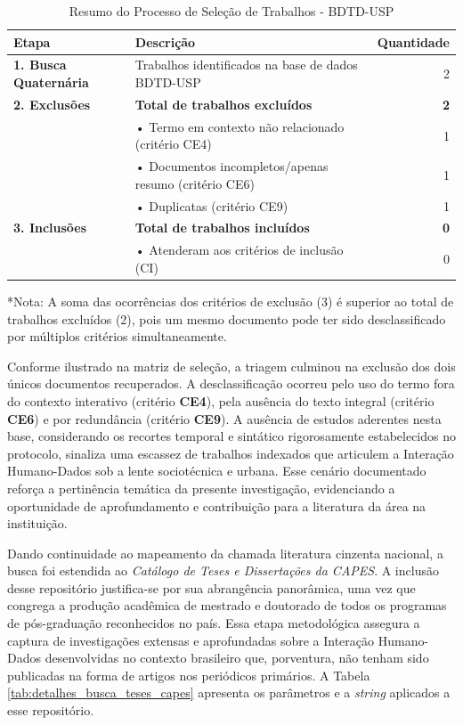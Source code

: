 \documentclass[
	12pt,				%
	oneside,			%
	a4paper,			%
	english,			%
	brazil				%
	]{abntex2ppgsi}
\begin{document}
\begin{table}[h]
\centering
\caption{Resumo do Processo de Seleção de Trabalhos - BDTD-USP}
\label{tab:resumo_selecao_BDTD_USP}
\begin{tabularx}{\textwidth}{lXr}
\toprule
\textbf{Etapa} & \textbf{Descrição} & \textbf{Quantidade} \\
\midrule
\textbf{1. Busca Quaternária} & Trabalhos identificados na base de dados BDTD-USP & 2 \\
\midrule
\textbf{2. Exclusões} & \textbf{Total de trabalhos excluídos} & \textbf{2} \\
& \hspace{0.5cm}• Termo em contexto não relacionado (critério CE4) & 1 \\
& \hspace{0.5cm}• Documentos incompletos/apenas resumo (critério CE6) & 1 \\
& \hspace{0.5cm}• Duplicatas (critério CE9) & 1 \\
\midrule
\textbf{3. Inclusões} & \textbf{Total de trabalhos incluídos} & \textbf{0} \\
& \hspace{0.5cm}• Atenderam aos critérios de inclusão (CI) & 0 \\
\bottomrule
\end{tabularx}
\vspace{0.2cm}
\footnotesize{*Nota: A soma das ocorrências dos critérios de exclusão (3) é superior ao total de trabalhos excluídos (2), pois um mesmo documento pode ter sido desclassificado por múltiplos critérios simultaneamente.}
\end{table}

    Conforme ilustrado na matriz de seleção, a triagem culminou na exclusão dos dois únicos documentos recuperados. A desclassificação ocorreu pelo uso do termo fora do contexto interativo (critério \textbf{CE4}), pela ausência do texto integral (critério \textbf{CE6}) e por redundância (critério \textbf{CE9}). A ausência de estudos aderentes nesta base, considerando os recortes temporal e sintático rigorosamente estabelecidos no protocolo, sinaliza uma escassez de trabalhos indexados que articulem a Interação Humano-Dados sob a lente sociotécnica e urbana. Esse cenário documentado reforça a pertinência temática da presente investigação, evidenciando a oportunidade de aprofundamento e contribuição para a literatura da área na instituição.

Dando continuidade ao mapeamento da chamada literatura cinzenta nacional, a busca foi estendida ao \textit{Catálogo de Teses e Dissertações da CAPES}. A inclusão desse repositório justifica-se por sua abrangência panorâmica, uma vez que congrega a produção acadêmica de mestrado e doutorado de todos os programas de pós-graduação reconhecidos no país. Essa etapa metodológica assegura a captura de investigações extensas e aprofundadas sobre a Interação Humano-Dados desenvolvidas no contexto brasileiro que, porventura, não tenham sido publicadas na forma de artigos nos periódicos primários. A Tabela \ref{tab:detalhes_busca_teses_capes} apresenta os parâmetros e a \textit{string} aplicados a esse repositório.
\end{document}
